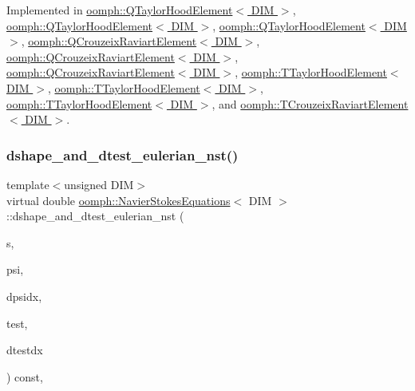Implemented in \hyperlink{classoomph_1_1QTaylorHoodElement_ad55f9bb30100dcc6b6b69eeec7cf4c06}{oomph\+::\+Q\+Taylor\+Hood\+Element$<$ D\+I\+M $>$}, \hyperlink{classoomph_1_1QTaylorHoodElement_abdb8ec3adc8877c83442269528f51ac3}{oomph\+::\+Q\+Taylor\+Hood\+Element$<$ D\+I\+M $>$}, \hyperlink{classoomph_1_1QTaylorHoodElement_ae37df57d30a5fdd716667e07ecd1796b}{oomph\+::\+Q\+Taylor\+Hood\+Element$<$ D\+I\+M $>$}, \hyperlink{classoomph_1_1QCrouzeixRaviartElement_a31e6429e9b705412f687b0304c2fd93b}{oomph\+::\+Q\+Crouzeix\+Raviart\+Element$<$ D\+I\+M $>$}, \hyperlink{classoomph_1_1QCrouzeixRaviartElement_a3984e7b6832c1794ae50cda8a48b8e75}{oomph\+::\+Q\+Crouzeix\+Raviart\+Element$<$ D\+I\+M $>$}, \hyperlink{classoomph_1_1QCrouzeixRaviartElement_a9f923e381bfe374b75238c2798eb4834}{oomph\+::\+Q\+Crouzeix\+Raviart\+Element$<$ D\+I\+M $>$}, \hyperlink{classoomph_1_1TTaylorHoodElement_af289723f650d3a19a59a8337b6667c45}{oomph\+::\+T\+Taylor\+Hood\+Element$<$ D\+I\+M $>$}, \hyperlink{classoomph_1_1TTaylorHoodElement_aa7eedbdb84e6b53605be1ee04dcbb076}{oomph\+::\+T\+Taylor\+Hood\+Element$<$ D\+I\+M $>$}, \hyperlink{classoomph_1_1TTaylorHoodElement_a4380043c9e57717edcd47202a1b87571}{oomph\+::\+T\+Taylor\+Hood\+Element$<$ D\+I\+M $>$}, and \hyperlink{classoomph_1_1TCrouzeixRaviartElement_a8f0a0b0ce73561795fdd55c04f8bdc98}{oomph\+::\+T\+Crouzeix\+Raviart\+Element$<$ D\+I\+M $>$}.

\mbox{\label{classoomph_1_1NavierStokesEquations_aeea4a1a3035ef93deaa68cc869e67dd8}} 
\subsubsection{\texorpdfstring{dshape\+\_\+and\+\_\+dtest\+\_\+eulerian\+\_\+nst()}{dshape\_and\_dtest\_eulerian\_nst()}}
{\footnotesize\ttfamily template$<$unsigned D\+IM$>$ \\
virtual double \hyperlink{classoomph_1_1NavierStokesEquations}{oomph\+::\+Navier\+Stokes\+Equations}$<$ D\+IM $>$\+::dshape\+\_\+and\+\_\+dtest\+\_\+eulerian\+\_\+nst (\begin{DoxyParamCaption}\item[{const \hyperlink{classoomph_1_1Vector}{Vector}$<$ double $>$ \&}]{s,  }\item[{\hyperlink{classoomph_1_1Shape}{Shape} \&}]{psi,  }\item[{\hyperlink{classoomph_1_1DShape}{D\+Shape} \&}]{dpsidx,  }\item[{\hyperlink{classoomph_1_1Shape}{Shape} \&}]{test,  }\item[{\hyperlink{classoomph_1_1DShape}{D\+Shape} \&}]{dtestdx }\end{DoxyParamCaption}) const\hspace{0.3cm}{\ttfamily [protected]}, {}}




